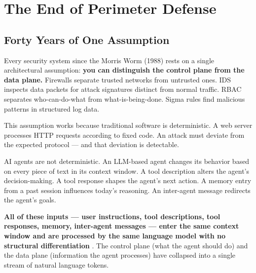 \documentclass[11pt,letterpaper]{article}
\begin{document}
\begin{abstract}
\textbf{(5)} We present Agent Threat Rules (ATR) \cite{atr}, the first open-source implementation of this standard, and validate it empirically: 61 YAML-based detection rules across 9 threat categories, independently benchmarked at 99.4\% precision and 39.9\% recall against the external PINT dataset \cite{pint} (850 samples), with a complete scan of the npm MCP ecosystem \cite{atrscan} (2,386 packages, 35,858 tool definitions) revealing that \textbf{49\% of packages contain security findings, with 27\% rated HIGH or CRITICAL.}
\end{abstract}


\section{The End of Perimeter Defense}
\label{sec:perimeter}

\subsection{Forty Years of One Assumption}

Every security system since the Morris Worm (1988) rests on a single architectural assumption: \textbf{you can distinguish the control plane from the data plane.} Firewalls separate trusted networks from untrusted ones. IDS inspects data packets for attack signatures distinct from normal traffic. RBAC separates who-can-do-what from what-is-being-done. Sigma rules \cite{sigma} find malicious patterns in structured log data.

This assumption works because traditional software is deterministic. A web server processes HTTP requests according to fixed code. An attack must deviate from the expected protocol --- and that deviation is detectable.

AI agents are not deterministic. An LLM-based agent changes its behavior based on every piece of text in its context window. A tool description alters the agent's decision-making. A tool response shapes the agent's next action. A memory entry from a past session influences today's reasoning. An inter-agent message redirects the agent's goals.

\textbf{All of these inputs --- user instructions, tool descriptions, tool responses, memory, inter-agent messages --- enter the same context window and are processed by the same language model with no structural differentiation} \cite{kim2026,chhabra2025,survey2026}. The control plane (what the agent should do) and the data plane (information the agent processes) have collapsed into a single stream of natural language tokens.
\end{document}
